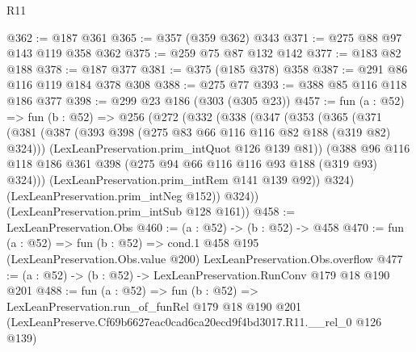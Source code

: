 \begin{lexlean}{R11}
\begin{coremodule}
@362 := @187 @361
@365 := @357 (@359 @362) @343
@371 := @275 @88 @97 @143 @119 @358 @362
@375 := @259 @75 @87 @132 @142
@377 := @183 @82 @188
@378 := @187 @377
@381 := @375 (@185 @378) @358
@387 := @291 @86 @116 @119 @184 @378 @308
@388 := @275 @77
@393 := @388 @85 @116 @118 @186 @377
@398 := @299 @23 @186 (@303 (@305 @23))
@457 := fun (a : @52) =>
  fun (b : @52) =>
  @256
    (@272
      (@332
        (@338
          (@347
            (@353
              (@365
                (@371
                  (@381
                    (@387 (@393 @398 (@275 @83 @66 @116 @116 @82 @188 (@319 @82) @324)))
                    (LexLeanPreservation.prim_intQuot @126 @139 @81))
                  (@388
                    @96
                    @116
                    @118
                    @186
                    @361
                    @398
                    (@275 @94 @66 @116 @116 @93 @188 (@319 @93) @324)))
                (LexLeanPreservation.prim_intRem @141 @139 @92))
              @324)
            (LexLeanPreservation.prim_intNeg @152))
          @324))
      (LexLeanPreservation.prim_intSub @128 @161))
@458 := LexLeanPreservation.Obs
@460 := (a : @52) -> (b : @52) -> @458
@470 := fun (a : @52) =>
  fun (b : @52) =>
  cond.{1} @458 @195 (LexLeanPreservation.Obs.value @200) LexLeanPreservation.Obs.overflow
@477 := (a : @52) -> (b : @52) -> LexLeanPreservation.RunConv @179 @18 @190 @201
@488 := fun (a : @52) =>
  fun (b : @52) =>
  LexLeanPreservation.run_of_funRel
    @179
    @18
    @190
    @201
    (LexLeanPreserve.Cf69b6627eac0cad6ca20ecd9f4bd3017.R11.__rel_0 @126 @139)
\end{coremodule}
\end{lexlean}
